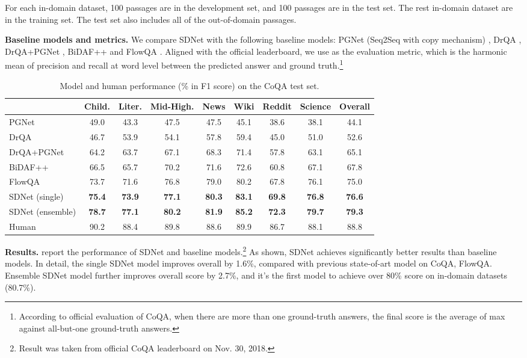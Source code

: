 \documentclass{article} \usepackage{sdnet,times}
\begin{document}
For each in-domain dataset, 100 passages are in the development set, and 100 passages are in the test set. The rest in-domain dataset are in the training set. The test set also includes all of the out-of-domain passages.

\textbf{Baseline models and metrics.}
We compare SDNet with the following baseline models: PGNet (Seq2Seq with copy mechanism) \citep{pgnet}, DrQA \citep{drqa}, DrQA+PGNet \citep{coqa}, BiDAF++ \citep{bidafplusplus} and FlowQA \citep{flowqa}. Aligned with the official leaderboard, we use  as the evaluation metric, which is the harmonic mean of precision and recall at word level between the predicted answer and ground truth.\footnote{According to official evaluation of CoQA, when there are more than one ground-truth answers, the final score is the average of max  against all-but-one ground-truth answers.}

\begin{table*}[t]
\centering
\caption{Model and human performance (\% in F1 score) on the CoQA test set.} 
\label{table:mainresult}
\vspace{-0.5\baselineskip}
\setlength{\tabcolsep}{2pt}
\begin{tabular}{l|ccccccc|c}
\toprule
 & Child. & Liter. & Mid-High. & News & Wiki & Reddit & Science & Overall \\
 \midrule
 \midrule
PGNet & 49.0 & 43.3 & 47.5 & 47.5 & 45.1 & 38.6 & 38.1 & 44.1 \\
DrQA & 46.7 & 53.9 & 54.1 & 57.8 & 59.4 & 45.0 & 51.0 & 52.6 \\
DrQA+PGNet & 64.2 & 63.7 & 67.1 & 68.3 & 71.4 & 57.8 & 63.1 & 65.1 \\
BiDAF++ & 66.5 & 65.7 & 70.2 & 71.6 & 72.6 & 60.8 & 67.1 & 67.8 \\
FlowQA & 73.7 & 71.6 & 76.8 & 79.0 & 80.2 & 67.8 & 76.1 & 75.0 \\
SDNet (single) & \textbf{75.4} & \textbf{73.9} & \textbf{77.1} & \textbf{80.3} & \textbf{83.1} & \textbf{69.8} & \textbf{76.8} & \textbf{76.6} \\
SDNet (ensemble) & \textbf{78.7} & \textbf{77.1} & \textbf{80.2} & \textbf{81.9} & \textbf{85.2} & \textbf{72.3} & \textbf{79.7} & \textbf{79.3} \\
\midrule
Human & 90.2 & 88.4 & 89.8 & 88.6 & 89.9 & 86.7 & 88.1 & 88.8 
\end{tabular}
\end{table*}

\textbf{Results.}   report the performance of SDNet and baseline models.\footnote{Result was taken from official CoQA leaderboard on Nov. 30, 2018.} As shown, SDNet achieves significantly better results than baseline models. In detail, the single SDNet model improves overall  by 1.6\%, compared with previous state-of-art model on CoQA, FlowQA. Ensemble SDNet model further improves overall  score by 2.7\%, and it's the first model to achieve over 80\%  score on in-domain datasets (80.7\%).
\end{document}
